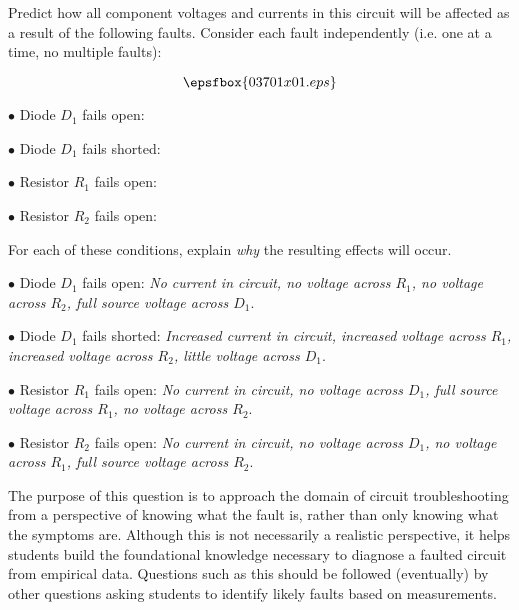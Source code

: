 

Predict how all component voltages and currents in this circuit will be affected as a result of the following faults.  Consider each fault independently (i.e. one at a time, no multiple faults):

$$\epsfbox{03701x01.eps}$$

\medskip
\item{$\bullet$} Diode $D_1$ fails open:
\vskip 5pt
\item{$\bullet$} Diode $D_1$ fails shorted:
\vskip 5pt
\item{$\bullet$} Resistor $R_1$ fails open:
\vskip 5pt
\item{$\bullet$} Resistor $R_2$ fails open:
\medskip

For each of these conditions, explain {\it why} the resulting effects will occur.







\medskip
\item{$\bullet$} Diode $D_1$ fails open: {\it No current in circuit, no voltage across $R_1$, no voltage across $R_2$, full source voltage across $D_1$}.
\vskip 5pt
\item{$\bullet$} Diode $D_1$ fails shorted: {\it Increased current in circuit, increased voltage across $R_1$, increased voltage across $R_2$, little voltage across $D_1$}.
\vskip 5pt
\item{$\bullet$} Resistor $R_1$ fails open: {\it No current in circuit, no voltage across $D_1$, full source voltage across $R_1$, no voltage across $R_2$}.
\vskip 5pt
\item{$\bullet$} Resistor $R_2$ fails open: {\it No current in circuit, no voltage across $D_1$, no voltage across $R_1$, full source voltage across $R_2$}.
\medskip







The purpose of this question is to approach the domain of circuit troubleshooting from a perspective of knowing what the fault is, rather than only knowing what the symptoms are.  Although this is not necessarily a realistic perspective, it helps students build the foundational knowledge necessary to diagnose a faulted circuit from empirical data.  Questions such as this should be followed (eventually) by other questions asking students to identify likely faults based on measurements.




